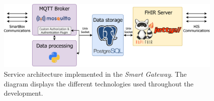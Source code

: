 \begin{figure}[H]
    \centering
    \includegraphics[width=0.93\linewidth]{images/service overview gateway.pdf}
    \caption[Service architecture implemented in the \textit{Smart Gateway}.]{Service architecture implemented in the \textit{Smart Gateway}. The diagram displays the different technologies used throughout the development.}
    \label{fig:gateway_serviceoverview}
\end{figure}
